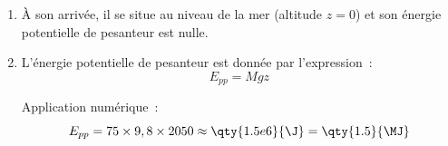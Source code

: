 \begin{enumerate}
    \item À son arrivée, il se situe au niveau de la mer (altitude $z=0$) et son
          énergie potentielle de pesanteur est nulle.
    \item L'énergie potentielle de pesanteur est donnée par l'expression~:
          \[
              E_{pp}=M g z
          \]


          Application numérique~:
          \[
              E_{pp}=75\times9,8\times2050\approx\qty{1.5e6}{\J}=\qty{1.5}{\MJ}
          \]
\end{enumerate}

